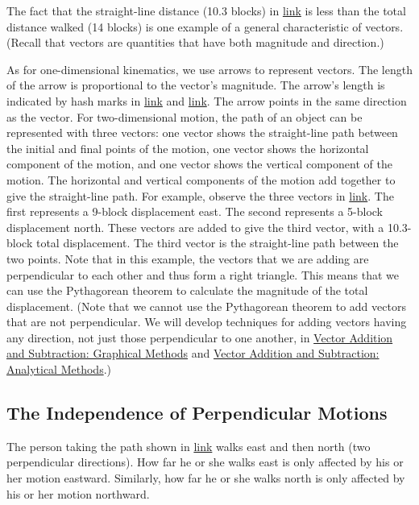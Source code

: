 \documentclass[
]{book}
\begin{document}
The fact that the straight-line distance (10.3 blocks) in
\protect\hyperlink{import-auto-id1165298535408}{link} is less
than the total distance walked (14 blocks) is one example of a general
characteristic of vectors. (Recall that
\protect\hypertarget{import-auto-id1165298541000}{}{vectors} are quantities
that have both magnitude and direction.)

As for one-dimensional kinematics, we use arrows to represent vectors.
The length of the arrow is proportional to the vector's magnitude. The
arrow's length is indicated by hash marks in
\protect\hyperlink{import-auto-id1165296250183}{link} and
\protect\hyperlink{import-auto-id1165298535408}{link}. The arrow
points in the same direction as the vector. For two-dimensional motion,
the path of an object can be represented with three vectors: one vector
shows the straight-line path between the initial and final points of the
motion, one vector shows the horizontal component of the motion, and one
vector shows the vertical component of the motion. The horizontal and
vertical components of the motion add together to give the straight-line
path. For example, observe the three vectors in
\protect\hyperlink{import-auto-id1165298535408}{link}. The first
represents a 9-block displacement east. The second represents a 5-block
displacement north. These vectors are added to give the third vector,
with a 10.3-block total displacement. The third vector is the
straight-line path between the two points. Note that in this example,
the vectors that we are adding are perpendicular to each other and thus
form a right triangle. This means that we can use the Pythagorean
theorem to calculate the magnitude of the total displacement. (Note that
we cannot use the Pythagorean theorem to add vectors that are not
perpendicular. We will develop techniques for adding vectors having any
direction, not just those perpendicular to one another, in \href{/m54781}{Vector
Addition and Subtraction: Graphical Methods} and \href{/m54783}{Vector
Addition and Subtraction: Analytical Methods}.)

\hypertarget{fs-id1165298695671}{}
\hypertarget{the-independence-of-perpendicular-motions}{%
\subsection{The Independence of Perpendicular Motions}\label{the-independence-of-perpendicular-motions}}

The person taking the path shown in
\protect\hyperlink{import-auto-id1165298535408}{link} walks east
and then north (two perpendicular directions). How far he or she walks
east is only affected by his or her motion eastward. Similarly, how far
he or she walks north is only affected by his or her motion northward.
\end{document}
